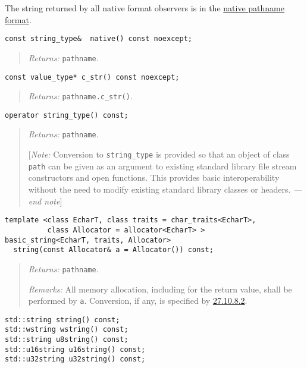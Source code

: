 The string returned by all native format observers is in the
\hyperref[fs.def.native]{native pathname format}.

\begin{verbatim}
const string_type&  native() const noexcept;
\end{verbatim}

\begin{quote}
\emph{Returns:} \texttt{pathname}.
\end{quote}

\begin{verbatim}
const value_type* c_str() const noexcept;
\end{verbatim}

\begin{quote}
\emph{Returns:} \texttt{pathname.c\_str()}.
\end{quote}

\begin{verbatim}
operator string_type() const;
\end{verbatim}

\begin{quote}
\emph{Returns:} \texttt{pathname}.

{[}\emph{Note:} Conversion to \texttt{string\_type} is provided so that
an object of class \texttt{path} can be given as an argument to existing
standard library file stream constructors and open functions. This
provides basic interoperability without the need to modify existing
standard library classes or headers. \emph{---end note}{]}
\end{quote}

\begin{verbatim}
template <class EcharT, class traits = char_traits<EcharT>,
          class Allocator = allocator<EcharT> >
basic_string<EcharT, traits, Allocator>
  string(const Allocator& a = Allocator()) const;
\end{verbatim}

\begin{quote}
\emph{Returns:} \texttt{pathname}.

\emph{Remarks:} All memory allocation, including for the return value,
shall be performed by \texttt{a}. Conversion, if any, is specified by
\hyperref[path.cvt]{27.10.8.2}.
\end{quote}

\begin{verbatim}
std::string string() const;
std::wstring wstring() const;
std::string u8string() const;
std::u16string u16string() const;
std::u32string u32string() const; 
\end{verbatim}

